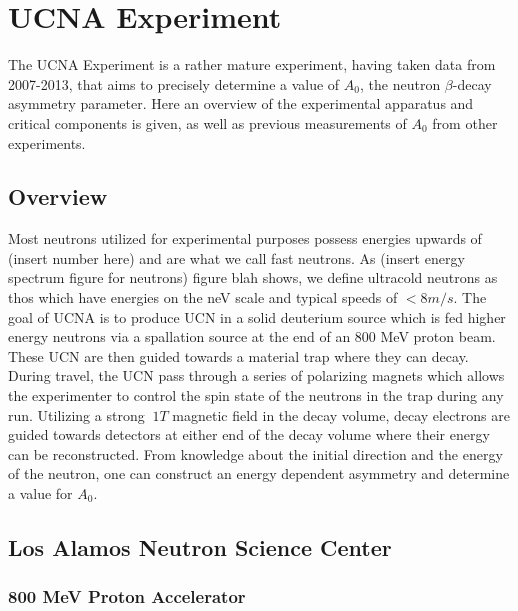 \chapter{UCNA Experiment}
\label{ch:UCNA_Experiment}

The UCNA Experiment is a rather mature experiment, having taken data from
2007-2013, that aims to precisely determine a value of $A_{0}$, the neutron
$\beta$-decay asymmetry parameter. Here an overview of the experimental
apparatus and critical components is given, as well as previous measurements
of $A_{0}$ from other experiments. 


\section{Overview}
\label{sec:Overview}

Most neutrons utilized for experimental purposes possess energies upwards of
(insert number here) and are what we call fast neutrons. As (insert energy
spectrum figure for neutrons) figure blah shows, we define ultracold neutrons
as thos which have energies on the neV scale and typical speeds of ${<8m/s}$.
The goal of UCNA is to produce UCN in a solid deuterium source which is fed
higher energy neutrons via a spallation source at the end of an $800$ MeV
proton beam. These UCN are then guided towards a material trap where they can
decay. During travel, the UCN pass through a series of polarizing magnets
which allows the experimenter to control the spin state of the neutrons in
the trap during any run. Utilizing a strong ${~1 T}$ magnetic field in the
decay volume, decay electrons are guided towards detectors at either end of
the decay volume where their energy can be reconstructed. From knowledge about
the initial direction and the energy of the neutron, one can construct an
energy dependent asymmetry and determine a value for $A_{0}$.

\section{Los Alamos Neutron Science Center}
\subsection{800 MeV Proton Accelerator}

